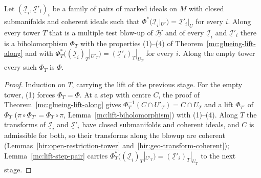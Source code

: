 \begin{lemma}
\label{mc:lift-transport-along}
\leanok
Let \((\underline{\mathcal I}_i,\underline{\mathcal I}'_i)_{i}\) be a family of pairs of marked ideals on \(M\) with closed submanifolds and coherent ideals such that
\(\Phi^*(\underline{\mathcal I}_i|_{U'})=\underline{\mathcal I}'_i|_U\) for every \(i\). Along every tower \(T\) that is a multiple test blow-up of \(\underline{\mathcal H}\) and of every
\(\underline{\mathcal I}_i\) and \(\underline{\mathcal I}'_i\) there is a biholomorphism \(\Phi_T\) with the properties (1)--(4) of Theorem~\ref{mc:glueing-lift-along} and with
\(\Phi_T^*((\underline{\mathcal I}_i)_T|_{U'_T})=(\underline{\mathcal I}'_i)_T|_{U_T}\) for every \(i\). Along the empty tower every such \(\Phi_T\) is \(\Phi\).
\end{lemma}
\begin{proof}
\leanok
Induction on \(T\), carrying the lift of the previous stage. For the empty tower, (1) forces \(\Phi_T=\Phi\). At a step with centre \(C\), the proof of
Theorem~\ref{mc:glueing-lift-along} gives \(\Phi_T^{-1}(C\cap U'_T)=C\cap U_T\) and a lift \(\Phi_{T'}\) of \(\Phi_T\) (\(\pi\circ\Phi_{T'}=\Phi_T\circ\pi\),
Lemma~\ref{mc:lift-biholomorphism}) with (1)--(4). Along \(T\) the transforms of \(\underline{\mathcal I}_i\) and \(\underline{\mathcal I}'_i\) have closed submanifolds and coherent
ideals, and \(C\) is admissible for both, so their transforms along the blowup are coherent (Lemmas~\ref{hir:open-restriction-tower} and~\ref{hir:geo-transform-coherent});
Lemma~\ref{mc:lift-step-pair} carries \(\Phi_T^*((\underline{\mathcal I}_i)_T|_{U'_T})=(\underline{\mathcal I}'_i)_T|_{U_T}\) to the next stage.
\end{proof}

